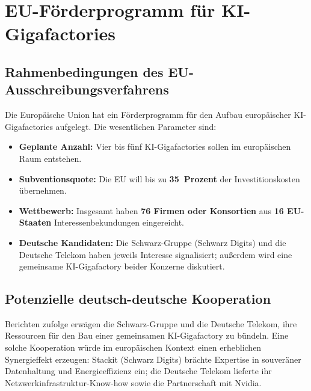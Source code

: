 ﻿\documentclass[12pt, a4paper, openany]{report}
\begin{document}
\section{EU-Förderprogramm für KI-Gigafactories}
\label{sec:eu_gigafactory}

\subsection{Rahmenbedingungen des EU-Ausschreibungsverfahrens}

Die Europäische Union hat ein Förderprogramm für den Aufbau europäischer
KI-Gigafac\-tories aufgelegt. Die wesentlichen Parameter sind:

\begin{itemize}[leftmargin=2em]
	\item \textbf{Geplante Anzahl:} Vier bis fünf KI-Gigafac\-tories sollen im
	europäischen Raum entstehen.
	\item \textbf{Subventionsquote:} Die EU will bis zu \textbf{35~Prozent}
	der Investitionskosten übernehmen.
	\item \textbf{Wettbewerb:} Insgesamt haben \textbf{76 Firmen oder Konsortien}
	aus \textbf{16 EU-Staaten} Interessenbekundungen eingereicht.
	\item \textbf{Deutsche Kandidaten:} Die Schwarz-Gruppe (Schwarz Digits)
	und die Deutsche Telekom haben jeweils Interesse signalisiert;
	außerdem wird eine gemeinsame KI-Gigafactory beider Konzerne diskutiert.
\end{itemize}

\subsection{Potenzielle deutsch-deutsche Kooperation}

Berichten zufolge erwägen die Schwarz-Gruppe und die Deutsche Telekom,
ihre Ressourcen für den Bau einer gemeinsamen KI-Gigafactory zu bündeln.
Eine solche Kooperation würde im europäischen Kontext einen erheblichen
Synergieffekt erzeugen: Stackit (Schwarz Digits) brächte Expertise in
souveräner Datenhaltung und Energieeffizienz ein; die Deutsche Telekom
lieferte ihr Netzwerkinfrastruktur-Know-how sowie die Partnerschaft
mit Nvidia.
\end{document}
